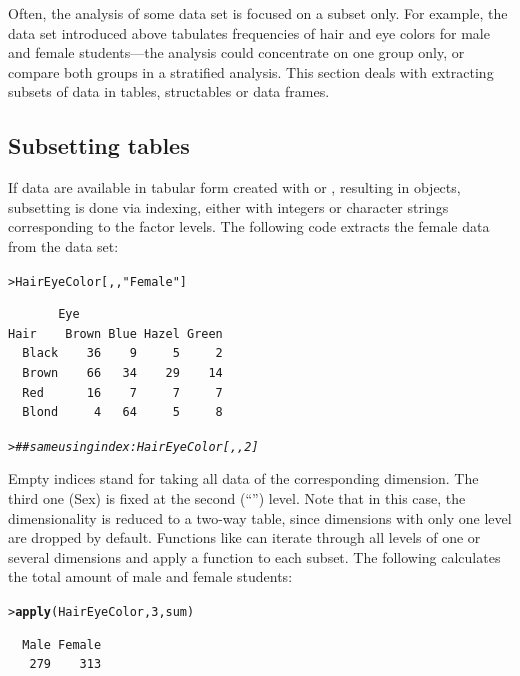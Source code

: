 \documentclass[10pt,krantz2]{krantz}\usepackage[]{graphicx}\usepackage[]{color}
\makeatletter
\newcommand{\hlnum}[1]{\textcolor[rgb]{0.686,0.059,0.569}{#1}}%
\newcommand{\hlstr}[1]{\textcolor[rgb]{0.192,0.494,0.8}{#1}}%
\newcommand{\hlcom}[1]{\textcolor[rgb]{0.678,0.584,0.686}{\textit{#1}}}%
\newcommand{\hlstd}[1]{\textcolor[rgb]{0.345,0.345,0.345}{#1}}%
\newcommand{\hlkwd}[1]{\textcolor[rgb]{0.737,0.353,0.396}{\textbf{#1}}}%
\newenvironment{kframe}{%
 \def\at@end@of@kframe{}%
 \ifinner\ifhmode%
  \def\at@end@of@kframe{\end{minipage}}%
  \begin{minipage}{\columnwidth}%
 \fi\fi%
 \def\FrameCommand##1{\hskip\@totalleftmargin \hskip-\fboxsep
 \colorbox{shadecolor}{##1}\hskip-\fboxsep
     \hskip-\linewidth \hskip-\@totalleftmargin \hskip\columnwidth}%
 \MakeFramed {\advance\hsize-\width
   \@totalleftmargin\z@ \linewidth\hsize
   \@setminipage}}%
 {\par\unskip\endMakeFramed%
 \at@end@of@kframe}
\newenvironment{knitrout}{}{} %
\renewenvironment{knitrout}{\small\renewcommand{\baselinestretch}{.85}}{} %
\makeatother
\begin{document}
Often, the analysis of some data set is focused on a subset only. For
example, the  data set introduced above tabulates frequencies of hair and
eye colors for male and female students---the analysis could
concentrate on one group only, or compare both groups in a stratified
analysis. This section deals with extracting subsets of data in
tables, structables or data frames.

\subsection[Subsetting tables]{Subsetting tables}\label{sec:subsettingtables}

If data are available in tabular form created with  or
, resulting in  objects, subsetting is done
via indexing, either with integers or character strings corresponding to
the factor levels. The following code extracts the female data from
the  data set:

\begin{knitrout}
\color{fgcolor}\begin{kframe}
\begin{alltt}
\hlstd{> }\hlstd{HairEyeColor[,,}\hlstr{"Female"}\hlstd{]}
\end{alltt}
\begin{verbatim}
       Eye
Hair    Brown Blue Hazel Green
  Black    36    9     5     2
  Brown    66   34    29    14
  Red      16    7     7     7
  Blond     4   64     5     8
\end{verbatim}
\begin{alltt}
\hlstd{> }\hlcom{##same using index: HairEyeColor[,,2]}
\end{alltt}
\end{kframe}
\end{knitrout}

\noindent Empty indices stand for taking all data of the corresponding
dimension. The third one (Sex) is fixed at the second (``'') 
level. Note that in this case, the dimensionality is reduced to a two-way
table, since dimensions with only one level are dropped by
default. Functions like  can iterate through all levels of
one or several dimensions and apply a function to each subset. The
following calculates the total amount of male and female students:

\begin{knitrout}
\color{fgcolor}\begin{kframe}
\begin{alltt}
\hlstd{> }\hlkwd{apply}\hlstd{(HairEyeColor,} \hlnum{3}\hlstd{, sum)}
\end{alltt}
\begin{verbatim}
  Male Female 
   279    313 
\end{verbatim}
\end{kframe}
\end{knitrout}
\end{document}

